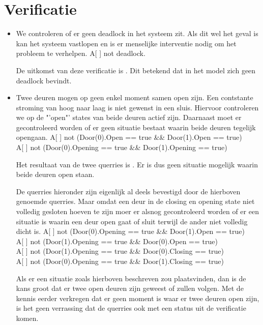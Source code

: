 \documentclass{article}
\begin{document}
\section{Verificatie}
\begin{itemize}
\item We controleren of er geen deadlock in het systeem zit. Als dit wel het geval is kan het systeem vastlopen en is er menselijke interventie nodig om het probleem te verhelpen.
{\center A[ ] not deadlock.\\}


De uitkomst van deze verificatie is {\color{green}{groen}}. Dit betekend dat in het model zich geen deadlock bevindt.


\item Twee deuren mogen op geen enkel moment samen open zijn. Een contstante stroming van hoog naar laag is niet gewenst in een sluis. Hiervoor controleren we op de "'open"' states van beide deuren actief zijn. Daarnaast moet er gecontroleerd worden of er geen situatie bestaat waarin beide deuren tegelijk opengaan.
{\center 
A[ ] not (Door(0).Open == true \&\& Door(1).Open == true)\\
A[ ] not (Door(0).Opening == true \&\& Door(1).Opening == true)\\
}


Het resultaat van de twee querries is {\color{green}{groen}}. Er is dus geen situatie mogelijk waarin beide deuren open staan.

De querries hieronder zijn eigenlijk al deels bevestigd door de hierboven genoemde querries. Maar omdat een deur in de closing en opening state niet volledig gesloten hoeven te zijn moer er alsnog gecontroleerd worden of er een situatie is waarin een deur open gaat of sluit terwijl de ander niet volledig dicht is.
{\center
A[ ] not (Door(0).Opening == true \&\& Door(1).Open == true)\\
A[ ] not (Door(1).Opening == true \&\& Door(0).Open == true)\\
\vskip0.1cm
A[ ] not (Door(1).Opening == true \&\& Door(0).Closing == true)\\
A[ ] not (Door(0).Opening == true \&\& Door(1).Closing == true)\\
}


Als er een situatie zoals hierboven beschreven zou plaatsvinden, dan is de kans groot dat er twee open deuren zijn geweest of zullen volgen. Met de kennis eerder verkregen dat er geen moment is waar er twee deuren open zijn, is het geen verrassing dat de querries ook met een {\color{green}{groene}} status uit de verificatie komen.



\end{itemize}
\end{document}
